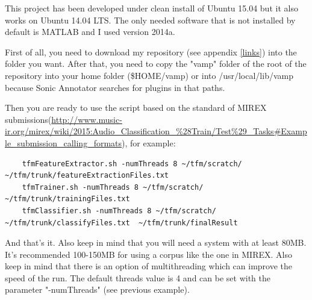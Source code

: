 \documentclass[a4paper,openany,oneside,12pt]{book}
\begin{document}
This project has been developed under clean install of Ubuntu 15.04 but it also works on Ubuntu 14.04 LTS. The only needed software that is not installed by default is MATLAB and I used version 2014a.

First of all, you need to download my repository (see appendix \ref{links}) into the folder you want. After that, you need to copy the "vamp" folder of the root of the repository into your home folder (\$HOME/vamp) or into /usr/local/lib/vamp because Sonic Annotator searches for plugins in that paths.

Then you are ready to use the script based on the standard of MIREX submissions(\url{http://www.music-ir.org/mirex/wiki/2015:Audio_Classification_%28Train/Test%29_Tasks#Example_submission_calling_formats}), for example:
   \lstset{language=Bash,
           basicstyle=\ttfamily\scriptsize,
           keywordstyle=\ttfamily,
           stringstyle=\ttfamily,
           commentstyle=\ttfamily,
          breaklines=true
          }
\begin{lstlisting}
	tfmFeatureExtractor.sh -numThreads 8 ~/tfm/scratch/ ~/tfm/trunk/featureExtractionFiles.txt
	tfmTrainer.sh -numThreads 8 ~/tfm/scratch/ ~/tfm/trunk/trainingFiles.txt
	tfmClassifier.sh -numThreads 8 ~/tfm/scratch/ ~/tfm/trunk/classifyFiles.txt  ~/tfm/trunk/finalResult
\end{lstlisting}
	
And that's it. Also keep in mind that you will need a system with at least 80MB. It's recommended 100-150MB for using a corpus like the one in MIREX. Also keep in mind that there is an option of multithreading which can improve the speed of the run. The default threads value is 4 and can be set with the parameter "-numThreads" (see previous example).
\end{document}
